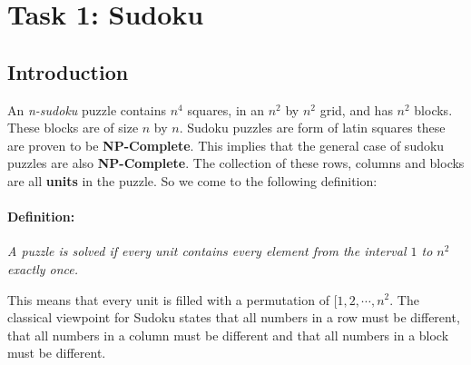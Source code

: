\section{Task 1: Sudoku}\label{sec:sudoku}
\subsection{Introduction}

An \textit{n-sudoku} puzzle contains $n^{4}$ squares, in an $n^{2}$ by $n^{2}$ grid, and has $n^{2}$ blocks. These blocks are of size $n$ by $n$. Sudoku puzzles are form of latin squares these are proven to be \textbf{NP-Complete}. This implies that the general case of sudoku puzzles are also \textbf{NP-Complete}. The collection of these rows, columns and blocks are all \textbf{units} in the puzzle. So we come to the following definition:

\paragraph*{Definition:}
\textit{A puzzle is solved if every unit contains every element from the interval $1$ to $n^2$ exactly once.}

This means that every unit is filled with a permutation of $[1,2,\cdots,n^{2}$. 
The classical viewpoint for Sudoku states that all numbers in a row must be different, that all numbers in a column must be different and that all numbers in a block must be different.\\

